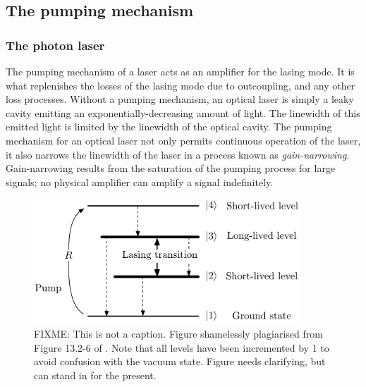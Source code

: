 % 
% 

\subsection{The pumping mechanism}

\subsubsection{The photon laser}

The pumping mechanism of a laser acts as an amplifier for the lasing mode.  It is what replenishes the losses of the lasing mode due to outcoupling, and any other loss processes.  Without a pumping mechanism, an optical laser is simply a leaky cavity emitting an exponentially-decreasing amount of light.  The linewidth of this emitted light is limited by the linewidth of the optical cavity.  The pumping mechanism for an optical laser not only permits continuous operation of the laser, it also narrows the linewidth of the laser in a process known as \emph{gain-narrowing}.  Gain-narrowing results from the saturation of the pumping process for large signals; no physical amplifier can amplify a signal indefinitely.  

\begin{figure}
    \centering
    \includegraphics[width=10cm]{4LevelOpticalLaserModel}
    \caption{
        \label{Introduction:4LevelOpticalLaserModel}
        FIXME: This is not a caption.  Figure shamelessly plagiarised from Figure 13.2-6 of \citep{SalehTeich}.  Note that all levels have been incremented by 1 to avoid confusion with the vacuum state.  Figure needs clarifying, but can stand in for the present.
    }
\end{figure}

